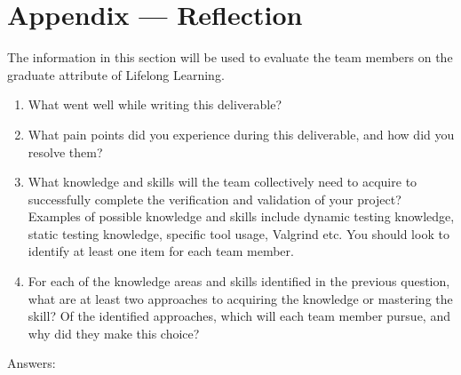 \documentclass[12pt, titlepage]{article}
\begin{document}
\newpage{}
\section*{Appendix --- Reflection}


The information in this section will be used to evaluate the team members on the
graduate attribute of Lifelong Learning.



\begin{enumerate}
  \item What went well while writing this deliverable? 
  \item What pain points did you experience during this deliverable, and how
    did you resolve them?
  \item What knowledge and skills will the team collectively need to acquire to
  successfully complete the verification and validation of your project?
  Examples of possible knowledge and skills include dynamic testing knowledge,
  static testing knowledge, specific tool usage, Valgrind etc.  You should look to
  identify at least one item for each team member.
  \item For each of the knowledge areas and skills identified in the previous
  question, what are at least two approaches to acquiring the knowledge or
  mastering the skill?  Of the identified approaches, which will each team
  member pursue, and why did they make this choice?
\end{enumerate}
Answers:
\end{document}
